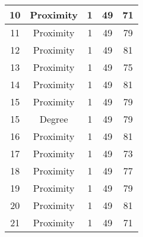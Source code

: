 \documentclass[results.tex]{subfiles}
\begin{document}
\begin{center}
\begin{tabular}{| c || c | c | c | c |}
            \hline
            10                      & Proximity                    & 1                      & 49                      & 71                   \\
            \hline
            11                      & Proximity                    & 1                      & 49                      & 79                   \\
            \hline
            12                      & Proximity                    & 1                      & 49                      & 81                   \\
            \hline
            13                      & Proximity                    & 1                      & 49                      & 75                   \\
            \hline
            14                      & Proximity                    & 1                      & 49                      & 81                   \\
            \hline
            15                      & Proximity                    & 1                      & 49                      & 79                   \\
            \hline
            15                      & Degree                       & 1                      & 49                      & 79                   \\
            \hline
            16                      & Proximity                    & 1                      & 49                      & 81                   \\
            \hline
            17                      & Proximity                    & 1                      & 49                      & 73                   \\
            \hline
            18                      & Proximity                    & 1                      & 49                      & 77                   \\
            \hline
            19                      & Proximity                    & 1                      & 49                      & 79                   \\
            \hline
            20                      & Proximity                    & 1                      & 49                      & 81                   \\
            \hline
            21                      & Proximity                    & 1                      & 49                      & 71                   \\

\end{tabular}
\end{center}
\end{document}
